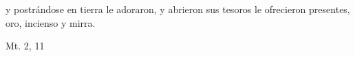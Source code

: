 \documentclass[../../rosario.tex]{subfiles}
\begin{document}
    y postrándose en tierra le adoraron, y abrieron sus tesoros le ofrecieron presentes, oro, incienso y mirra.
    \begin{flushright}
    Mt. 2, 11         
    \end{flushright}   
\end{document}
